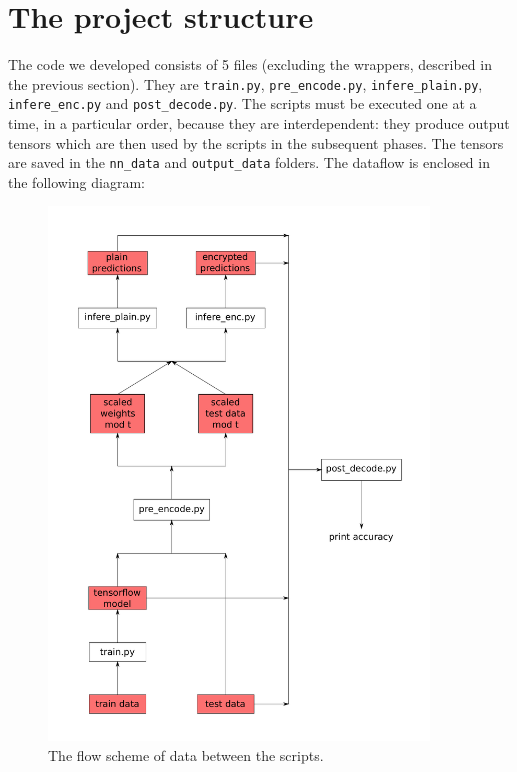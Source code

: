 \section{The project structure}

The code we developed consists of 5 files (excluding the wrappers, described in the previous section). They are \texttt{train.py}, \texttt{pre_encode.py}, \texttt{infere_plain.py}, \texttt{infere_enc.py} and \texttt{post_decode.py}. The scripts must be executed one at a time, in a particular order, because they are interdependent: they produce output tensors which are then used by the scripts in the subsequent phases. The tensors are saved in the \texttt{nn_data} and \texttt{output_data} folders. The dataflow is enclosed in the following diagram:

\begin{figure}[H]
	\centering
	\includegraphics[width=0.9\textwidth]{images/fig4a.pdf}
    \caption{The flow scheme of data between the scripts.}
    \label{fig:im4}
\end{figure}

